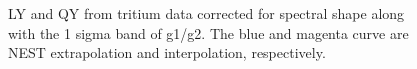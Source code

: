 \begin{figure}[h!]
\hfill
{}

\caption{LY and QY from tritium data corrected for spectral shape along with the 1 sigma band of g1/g2. The blue and magenta curve are NEST extrapolation and interpolation, respectively.}
\label{fig:LYQY_data}
\end{figure}
\renewcommand{\baselinestretch}{2}
\small\normalsize




